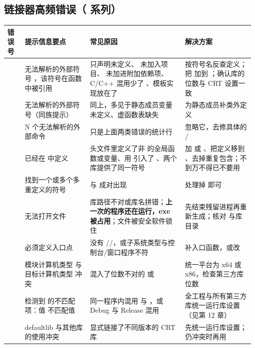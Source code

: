 \subsection{链接器高频错误（ 系列）}
\begin{longtable}{L{1.9cm}L{4.0cm}L{4.3cm}L{4.0cm}}
\toprule
\textbf{错误号} & \textbf{提示信息要点} & \textbf{常见原因} & \textbf{解决方案} \\ \midrule
\endhead \bottomrule \endlastfoot
{} & 无法解析的外部符号 ，该符号在函数  中被引用 & 只声明未定义、 未加入项目、 未加进附加依赖项、C/C++ 混用少了 、模板实现放在了  & 按符号名反查定义；把  加到 ；确认库的位数与 CRT 设置一致 \\
 & 无法解析的外部符号（同族提示） & 同上，多见于静态成员变量未定义、虚函数表缺失 & 为静态成员补类外定义 \\
 & N 个无法解析的外部命令 & 只是上面两类错误的统计行 & 忽略它，去修具体的  /  \\
 &  已经在  中定义 & 头文件里定义了非  的全局函数或变量、用  引入了 、两个库提供了同一符号 & 加  或 、把定义移到 、去掉重复包含；不到万不得已不要用  \\
 & 找到一个或多个多重定义的符号 & 与  成对出现 & 处理掉  即可 \\
 & 无法打开文件  & 库路径不对或库名拼错；\textbf{上一次的程序还在运行，exe 被占用}；文件被安全软件锁住 & 先结束残留进程再重新生成；核对  与库目录 \\
 & 必须定义入口点 & 没有 //，或子系统类型与控制台/窗口程序不符 & 补入口函数，或改  \\
 & 模块计算机类型  与目标计算机类型  冲突 & 混入了位数不对的  或  & 统一平台为 x64 或 x86，检查第三方库位数 \\
 & 检测到  的不匹配项：值  不匹配值  & 同一程序内混用  与 ，或 Debug 与 Release 混用 & 全工程与所有第三方库统一运行库设置（见第 12 章） \\
 & defaultlib  与其他库的使用冲突 & 显式链接了不同版本的 CRT 库 & 先统一运行库设置；仍冲突时再用  \\
\end{longtable}

